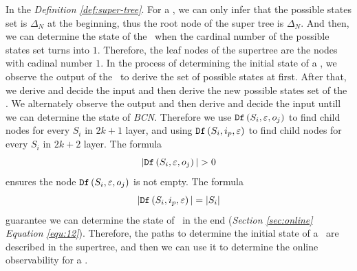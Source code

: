 In the {\em Definition \ref{def:super-tree}}. For a \BCN, we can only infer that the possible states set is $\Delta_N$ at the beginning, thus the root node of the super tree is $\Delta_N$. And then,  we can determine the state of the \BCN\ when the cardinal number of the possible states set turns into $1$. Therefore, the leaf nodes of the supertree are the nodes with cadinal number $1$. In the process of determining the initial state of a \BCN, we observe the output of the \BCN\ to derive the set of possible states at first. After that, we derive and decide the input and then derive the new possible states set of the \BCN. We alternately observe the output and then derive and decide the input untill we can determine the state of {\em BCN}. Therefore we use ${\tt Df}\left(S_i,\varepsilon, o_j\right)$ to find child nodes for every $S_i$ in $2k+1$ layer, and using ${\tt Df}\left(S_i,i_p,\varepsilon\right)$ to find child nodes for every $S_i$ in $2k+2$ layer. The formula 
\[|\Ded\left(S_i,\varepsilon, o_j\right)|>0\]
 ensures the node ${\tt Df}\left(S_i,\varepsilon, o_j\right)$ is not empty. The formula 
 \[|{\tt Df}\left(S_i,i_p,\varepsilon\right)|=|S_i|\] 
 guarantee we can determine the state of \BCN\ in the end ({\em Section \ref{sec:online}} {\em Equation \ref{equ:12}}). Therefore, the paths to determine the initial state of a \BCN\ are described in the supertree, and then we can use it to determine the online observability for a \BCN.

